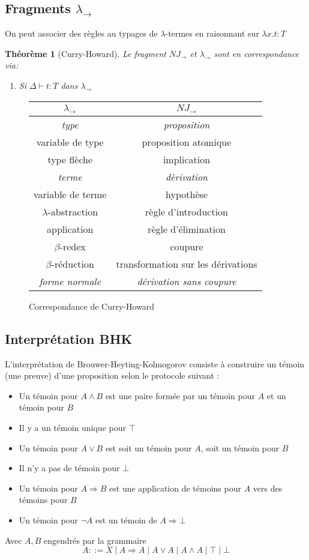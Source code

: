 \documentclass{article}
\newtheorem{thm}{Théorème}
\newcommand\lterm[2]{\lambda #1. #2}
\newcommand\tlambda[0]{$\lambda$}
\begin{document}
\subsection{Fragments $\lambda_\to$}
On peut associer des règles au typages de \tlambda-termes en raisonnant sur $\lterm{x}{t} : T$


\begin{thm}[Curry-Howard]
Le fragment $NJ_\to$ et $\lambda_\to$ sont en correspondance via:
\begin{enumerate}
\item Si $\Delta \vdash t : T$ dans $\lambda_\to$
\end{enumerate}
\end{thm}

\begin{figure}[h]
\begin{center}
\begin{tabular}{| c | c |}
\hline
$\lambda_\to$ & $NJ_\to$\\
\hline
\emph{type} & \emph{proposition}\\
\hline
variable de type & proposition atomique\\
type flèche & implication\\
\hline
\emph{terme} & \emph{dèrivation}\\
\hline
variable de terme & hypothèse\\
\tlambda-abstraction & règle d'introduction\\
application & règle d'élimination\\
$\beta$-redex & coupure\\
$\beta$-réduction & transformation sur les dérivations\\
\hline
\emph{forme normale} & \emph{dérivation sans coupure}\\
\hline
\end{tabular}
\caption{Correspondance de Curry-Howard}
\end{center}
\end{figure}


\subsection{Interprétation BHK}
L'interprétation de Brouwer-Heyting-Kolmogorov consiste à construire un témoin (une preuve) d'une proposition selon le protocole suivant :
\begin{itemize}
\item Un témoin pour $A \land B$ est une paire formée par un témoin pour $A$ et un témoin pour $B$
\item Il y a un témoin unique pour $\top$
\item Un témoin pour $A\lor B$ est soit un témoin pour $A$, soit un témoin pour $B$
\item Il n'y a pas de témoin pour $\bot$
\item Un témoin pour $A\Rightarrow B$ est une application de témoins pour $A$ vers des témoins pour $B$
\item Un témoin pour $\neg A$ est un témoin de $A \Rightarrow \bot$
\end{itemize}
Avec $A, B$ engendrés par la grammaire
\[A ::= X \;|\: A \Rightarrow A \;|\; A \lor A \;|\; A \land A \;|\; \top \;|\; \bot\]
\end{document}
